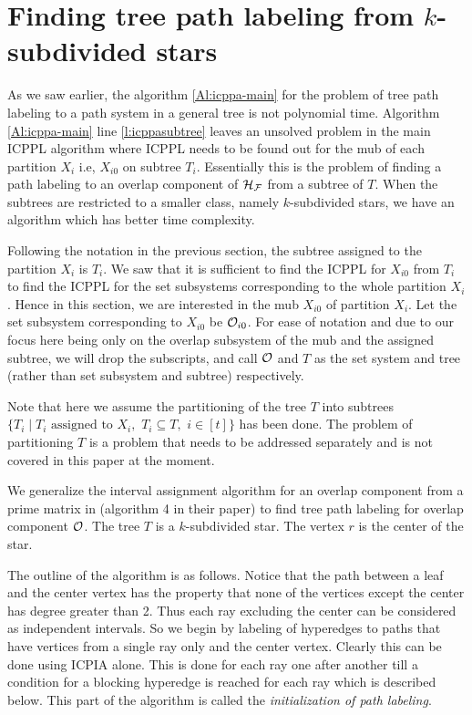 \documentclass{fsttcs}
\def\cF{{\cal F}}
\def\cH{{\cal H}}
\def\cO{{\cal O}}
\begin{document}
\section{Finding tree path labeling from $k$-subdivided stars}
\label{sec:ksubdivstar}
As we saw earlier, the algorithm \ref{Al:icppa-main} for the problem
of tree path labeling to a path system in a general tree is not
polynomial time. Algorithm \ref{Al:icppa-main} line
\ref{l:icppasubtree} leaves an unsolved problem in the main ICPPL
algorithm where ICPPL needs to be found out for the mub of each
partition $X_i$ i.e, $X_{i0}$ on subtree $T_i$. Essentially this is
the problem of finding a path labeling to an overlap component of $\cH_\cF$ from a
subtree of $T$.
When the subtrees are restricted to a smaller class, namely 
$k$-subdivided stars, we have an algorithm which has better time complexity.

\noindent
Following the notation in the previous section, the subtree assigned to the partition
$X_i$ is $T_i$. We saw that it is sufficient to find the ICPPL for $X_{i0}$
from $T_i$ to find the ICPPL for the set subsystems corresponding to
the whole partition $X_i$. Hence in this section, we are interested in
the mub $X_{i0}$ of partition $X_i$.  Let the set subsystem
corresponding to $X_{i0}$ be $\cO_{i0}$. For ease of notation and due to our focus here being only on the overlap subsystem
of the mub and the assigned subtree, we will drop the subscripts, and
call $\cO$ and $T$ as the set system and tree (rather than set
subsystem and subtree) respectively.

\noindent
Note that here we assume the partitioning of the tree $T$
into subtrees $\{T_i \mid T_i \text{ assigned to } X_i,$ $T_i \subseteq T,$  $i \in [t]\}$ has been
done. The problem of partitioning $T$ is a problem that needs to be
addressed separately and is not covered in this paper at the moment.


\noindent
We generalize the interval assignment algorithm for an overlap
component from a prime matrix in \cite{nsnrs09} (algorithm 4 in their paper) to find
tree path labeling for overlap component $\cO$. The tree $T$ is a
$k$-subdivided star. The vertex $r$ is the center of the star.

\noindent
The outline of the algorithm is as follows. Notice that the path
between a leaf and the center vertex has the property that none of the
vertices except the center has degree greater than 2. Thus each ray excluding the center
can be considered as independent intervals. 
 So we begin by labeling of hyperedges to paths that have vertices
 from a single ray only and the center vertex. Clearly this can be
 done using ICPIA alone. This is done for each ray one
after another till a condition for a blocking hyperedge is reached
for each ray which is described below. This part of the algorithm is called the
{\em initialization of path labeling}. 
\end{document}
